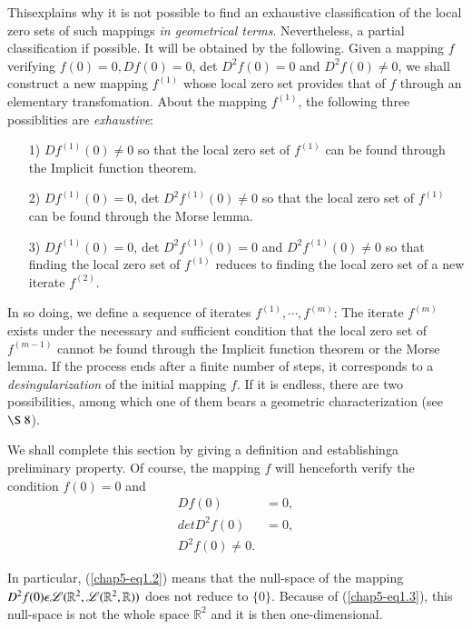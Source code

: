 This\pageoriginale explains why it is not possible to find an
exhaustive classification of the local zero sets of such mappings {\em
in geometrical terms}. Nevertheless, a partial classification if
possible. It will be obtained by the following. Given a mapping $f$
verifying $f(0) = 0, Df(0) = 0$, det $D^{2}f(0) = 0$ and $D^{2}f(0)
\neq 0$, we shall construct a new mapping $f^{(1)}$ whose local zero
set provides that of $f$ through an elementary transfomation. About the
mapping $f^{(1)}$, the following three possiblities are {\em
  exhaustive}:
\begin{enumerate}
\item[1)] $Df^{(1)} (0) \neq 0$ so that the local zero set of
  $f^{(1)}$ can be found through the Implicit function theorem.

\item[2)] $Df^{(1)} (0) = 0$, det $D^{2}f^{(1)} (0) \neq 0$ so that
  the local zero set of $f^{(1)}$ can be found through the Morse lemma.

\item[3)] $Df^{(1)} (0) = 0$, det $D^{2}f^{(1)}(0) = 0$ and
  $D^{2}f^{(1)} (0) \neq 0$ so that finding the local zero set of
  $f^{(1)}$ reduces to finding the local zero set of a new iterate $f^{(2)}$.
\end{enumerate}

In so doing, we define a sequence of iterates $f^{(1)}, \cdots,
f^{(m)}$: The iterate $f^{(m)}$ exists under the necessary and
sufficient condition that the local zero set of $f^{(m-1)}$ cannot be
found through the Implicit function theorem or the Morse lemma. If the
process ends after a finite number of steps, it corresponds to a {\em
  desingularization} of the initial mapping $f$. If it is endless, there
are two possibilities, among which one of them bears a geometric
characterization (see $\S\ 8$).

We shall complete this section by giving a definition and
establishing\pageoriginale a preliminary property. Of course, the
mapping $f$ will henceforth verify the condition $f(0) = 0$ and 
\begin{align*}
Df(0) & = 0,\tag{1.1}\label{chap5-eq1.1}\\
det D^{2}f(0) & = 0,\tag{1.2}\label{chap5-eq1.2}\\
D^{2}f(0) \neq 0.\tag{1.3}\label{chap5-eq1.3}
\end{align*}

In particular, (\ref{chap5-eq1.2}) means that the null-space of the
mapping $D^{2}f(0)\break \epsilon \mathscr{L}(\mathbb{R}^{2}, \mathscr{L}
(\mathbb{R}^{2}, \mathbb{R}))$ does not reduce to $\{0\}$. Because of
(\ref{chap5-eq1.3}), this null-space is not the whole space
$\mathbb{R}^{2}$ and it is then one-dimensional.


